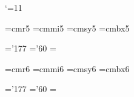 
\catcode`\@=11






\font\vptrm=cmr5
\font\vptmit=cmmi5
\font\vptsy=cmsy5
\font\vptbf=cmbx5

\skewchar\vptmit='177 \skewchar\vptsy='60
 \vptsy=\the{} \vptsy

\def\vpt{\ifmmode\err@badsizechange\else
     \@mathfontinit
     \textfont0=\vptrm  \scriptfont0=\vptrm  \scriptscriptfont0=\vptrm
     \textfont1=\vptmit \scriptfont1=\vptmit \scriptscriptfont1=\vptmit
     \textfont2=\vptsy  \scriptfont2=\vptsy  \scriptscriptfont2=\vptsy
     \textfont3=\xptex  \scriptfont3=\xptex  \scriptscriptfont3=\xptex
     \textfont\bffam=\vptbf
     \scriptfont\bffam=\vptbf
     \scriptscriptfont\bffam=\vptbf
     \@fontstyleinit
     \def\rm{\vptrm\fam=\z@}%
     \def\bf{\vptbf\fam=\bffam}%
     \def\oldstyle{\vptmit\fam=\@ne}%
     \rm\fi}


\font\viptrm=cmr6
\font\viptmit=cmmi6
\font\viptsy=cmsy6
\font\viptbf=cmbx6

\skewchar\viptmit='177 \skewchar\viptsy='60
 \viptsy=\the{} \viptsy

\def\vipt{\ifmmode\err@badsizechange\else
     \@mathfontinit
     \textfont0=\viptrm  \scriptfont0=\vptrm  \scriptscriptfont0=\vptrm
     \textfont1=\viptmit \scriptfont1=\vptmit \scriptscriptfont1=\vptmit
     \textfont2=\viptsy  \scriptfont2=\vptsy  \scriptscriptfont2=\vptsy
     \textfont3=\xptex   \scriptfont3=\xptex  \scriptscriptfont3=\xptex
     \textfont\bffam=\viptbf
     \scriptfont\bffam=\vptbf
     \scriptscriptfont\bffam=\vptbf
     \@fontstyleinit
     \def\rm{\viptrm\fam=\z@}%
     \def\bf{\viptbf\fam=\bffam}%
     \def\oldstyle{\viptmit\fam=\@ne}%
     \rm\fi}

